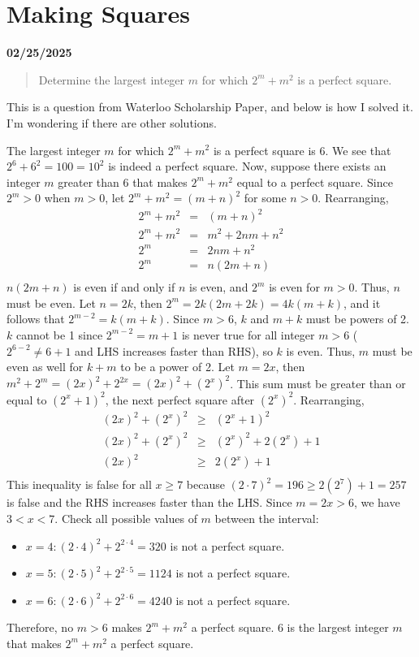 \documentclass[12pt, oneside]{article}
\begin{document}
\section*{Making Squares}
\textbf{02/25/2025}
\begin{quote}
Determine the largest integer $m$ for which $2^m + m^2$ is a perfect square.
\end{quote}
This is a question from Waterloo Scholarship Paper, and below is how I solved it. I'm wondering if there are other solutions.

The largest integer $m$ for which $2^m + m^2$ is a perfect square is 6. We see that $2^6+6^2 = 100 = 10^2$ is indeed a perfect square. Now, suppose there exists an integer $m$ greater than 6 that makes $2^m + m^2$ equal to a perfect square. Since $2^m>0$ when $m>0$, let $2^m + m^2 = (m+n)^2$ for some $n>0$. Rearranging,
\begin{eqnarray*}
2^m + m^2 &=& (m+n)^2\\
2^m + m^2 &=& m^2 + 2nm + n^2\\
2^m &=& 2nm + n^2\\
2^m &=& n(2m + n)\\
\end{eqnarray*}
$n(2m + n)$ is even if and only if $n$ is even, and $2^m$ is even for $m>0$. Thus, $n$ must be even. Let $n=2k$, then $2^m = 2k(2m+2k) = 4k(m+k)$, and it follows that $2^{m-2} = k(m+k)$. Since $m>6$, $k$ and $m+k$ must be powers of 2. $k$ cannot be 1 since $2^{m-2}=m+1$ is never true for all integer $m>6$ ($2^{6-2} \neq 6+1$ and LHS increases faster than RHS), so $k$ is even. Thus, $m$ must be even as well for $k+m$ to be a power of 2. Let $m=2x$, then $m^2+2^m=(2x)^2 + 2^{2x} = (2x)^2 + (2^x)^2$. This sum must be greater than or equal to $(2^x+1)^2$, the next perfect square after $(2^x)^2$. Rearranging,
\begin{eqnarray*}
(2x)^2 + (2^x)^2 &\geq& (2^x+1)^2\\
(2x)^2 + (2^x)^2 &\geq& (2^x)^2 +2(2^x) + 1\\
(2x)^2 &\geq& 2(2^x) + 1\\
\end{eqnarray*}
This inequality is false for all $x \geq 7$ because $(2 \cdot 7)^2 = 196 \geq 2 (2^7) + 1 = 257$ is false and the RHS increases faster than the LHS. Since $m=2x>6$, we have $3<x<7$. Check all possible values of $m$ between the interval:
\begin{itemize}
\item $x=4: (2 \cdot 4)^2 + 2^{2 \cdot 4} = 320$ is not a perfect square.
\item $x=5: (2 \cdot 5)^2 + 2^{2 \cdot 5} = 1124$ is not a perfect square.
\item $x=6: (2 \cdot 6)^2 + 2^{2 \cdot 6} = 4240$ is not a perfect square.
\end{itemize}
Therefore, no $m>6$ makes $2^m + m^2$ a perfect square. 6 is the largest integer $m$ that makes $2^m + m^2$ a perfect square.
\end{document}
